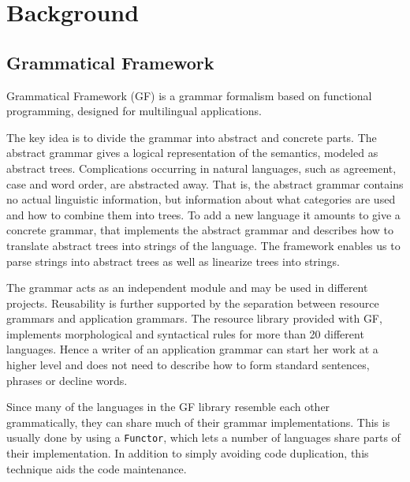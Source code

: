 \documentclass[submission]{eptcs} %
\begin{document}
\section{Background}
\label{sec:background}
\subsection{Grammatical Framework}
\label{sec:gf}


Grammatical Framework\cite{ranta-2011} (GF) is a grammar formalism based on functional
programming, designed for multilingual applications.

The key idea is to divide the grammar into abstract and concrete parts. %
The abstract grammar gives a logical representation of the semantics,
modeled as abstract trees. Complications occurring in
natural languages, such as agreement, case and word order, are abstracted away. 
That is, the abstract grammar contains no actual linguistic information, but
information about what categories are used and how to combine them into trees.
To add a new language it amounts to give a concrete grammar, that implements
the abstract grammar and describes how to translate abstract
trees into strings of the language. The framework enables us to parse strings into 
abstract trees as well as linearize trees into strings.

The grammar acts as an independent module and may be used in different
projects.
Reusability is further supported by the separation between resource grammars
and application grammars. The resource library provided with GF, 
implements morphological and
syntactical rules for more than 20 different languages.
Hence a writer of an application grammar can start her work at a higher
level and does not need to describe how to 
form standard sentences, phrases or decline words.

Since many of the languages in the GF library resemble each other grammatically,
they can share much of their grammar implementations. This is usually done by using a
\verb|Functor|, which lets a number of languages share parts of their implementation. 
In addition to simply avoiding code duplication, this technique aids the code maintenance.
\end{document}

